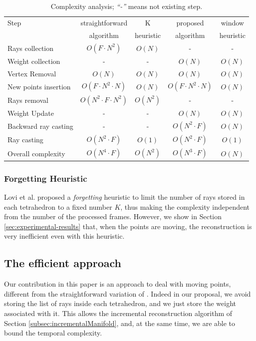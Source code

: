 \begin{table}[t]
\caption{Complexity analysis; \emph{``-''} means not existing step.}
\label{tab:ComStraight}
\scriptsize
\centering
\begin{tabular}{lcccc}
\toprule 
Step                & straightforward     & K  & proposed     & window \\
                    & algorithm & heuristic & algorithm & heuristic \\
\midrule
Rays collection     &  $O(F\cdot N^2)$ & $O(N)$ &-&-\\
Weight collection    &-&- &  $O(N)$ & $O(N)$ \\
Vertex Removal      &  $O(N)$           & $O(N)$ &  $O(N)$           & $O(N)$ \\
New points insertion&  $O(F\cdot N^2 \cdot N)$ & $O(N)$ &  $O(F\cdot N^2 \cdot N)$ & $O(N)$ \\
Rays removal     &  $O(N^2\cdot F\cdot N^2)$ & $O(N^2)$ &-&-\\
Weight Update     &-&-&  $O(N)$ & $O(N)$ \\
Backward ray casting &-&-    &  $O(N^2\cdot F)$ & $O(N)$ \\
Ray casting     &  $O(N^2\cdot F)$ & $O(1)$ &  $O(N^2\cdot F)$ & $O(1)$ \\
\midrule
Overall complexity     &  $O(N^4\cdot F)$ & $O(N^2)$ &  $O(N^3\cdot F)$ & $O(N)$ \\
\end{tabular}
\end{table}

\subsubsection{Forgetting Heuristic}
Lovi et al. \cite{lovi_et_al_11} proposed a \emph{forgetting} heuristic to limit the number of rays stored in each tetrahedron to a fixed number $K$, thus making the complexity independent from the number of the processed frames. 
However, we show in Section \ref{sec:experimental-results} that, when the points are moving,  the reconstruction is very inefficient even with this heuristic.

\subsection{The efficient approach}
\label{subsec:efficient_way}
Our contribution in this paper is an approach to deal with moving points, different from the straightforward variation of \cite{lovi_et_al_11}. Indeed in our proposal, we avoid storing the list of rays inside each tetrahedron, and we just store the weight associated with it.
This allows the incremental reconstruction algorithm of Section \ref{subsec:incrementalManifold}, and, at the same time, we are able to bound the temporal complexity.

